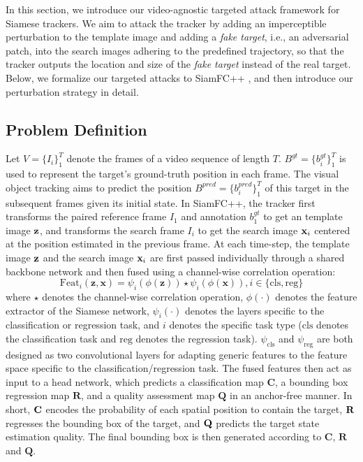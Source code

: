 \documentclass[journal]{IEEEtran}
\begin{document}
In this section, we introduce our video-agnostic targeted attack framework for Siamese trackers. We aim to attack the tracker by adding an imperceptible perturbation to the template image and adding a \textit{fake target}, i.e., an adversarial patch, into the search images adhering to the predefined trajectory, so that the tracker outputs the location and size of the \textit{fake target} instead of the real target. Below, we formalize our targeted attacks to SiamFC++ \cite{SiamFC++}, and then introduce our perturbation strategy in detail.
 
\subsection{Problem Definition}

Let $V=\{I_i\}_1^T$ denote the frames of a video sequence of length $T$. $B^{gt}=\{b^{gt}_i\}_1^T$ is used to represent the target's ground-truth position in each frame. The visual object tracking aims to predict the position $B^{pred}=\{b^{pred}_i\}_1^T$ of this target in the subsequent frames given its initial state. In SiamFC++, the tracker first transforms the paired reference frame $I_1$ and annotation $b_1^{gt}$ to get an template image $\textbf z$, and transforms the search frame $I_i$ to get the search image $\textbf x_i$ centered at the position estimated in the previous frame. At each time-step, the template image $\textbf z$ and the search image $\textbf x_i$ are first passed individually through a shared backbone network and then fused using a channel-wise correlation operation:
\begin{equation}
  \text{Feat}_{i}(\mathbf{z}, \mathbf{x})=\psi_{i}(\phi(\mathbf{z})) \star \psi_{i}(\phi(\mathbf{x})), i \in\{\mathrm{cls}, \mathrm{reg}\}
\end{equation}
where $\star$ denotes the channel-wise correlation operation, $\phi(\cdot)$ denotes the feature extractor of the Siamese network, $\psi_i(\cdot)$ denotes the layers specific to the classification or regression task, and $i$ denotes the specific task type ($\mathrm{cls}$ denotes the classification task and $\mathrm{reg}$ denotes the regression task). $\psi_{\mathrm{cls}}$ and $\psi_{\mathrm{reg}}$ are both designed as two convolutional layers for adapting generic features to the feature space specific to the classification/regression task. The fused features then act as input to a head network, which predicts a classification map $\textbf{C}$, a bounding box regression map $\textbf{R}$, and a quality assessment map $\textbf{Q}$ in an anchor-free manner. In short, $\textbf C$ encodes the probability of each spatial position to contain the target, $\textbf R$ regresses the bounding box of the target, and $\textbf Q$ predicts the target state estimation quality. The final bounding box is then generated according to $\textbf{C}$, $\textbf{R}$ and $\textbf{Q}$.
\end{document}
